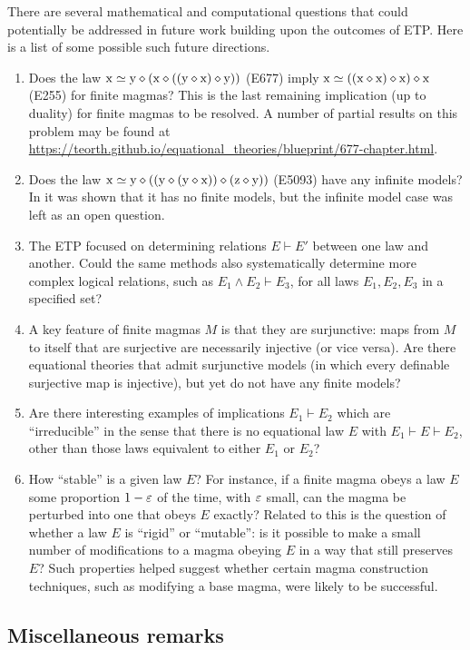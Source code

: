 There are several mathematical and computational questions that could potentially be addressed in future work building upon the outcomes of ETP.  Here is a list of some possible such future directions.
\begin{enumerate}
  \item Does the law $\mathrm{x} \simeq \mathrm{y} \diamond (\mathrm{x} \diamond ((\mathrm{y} \diamond \mathrm{x}) \diamond \mathrm{y}))$ (E677) imply $\mathrm{x} \simeq ((\mathrm{x} \diamond \mathrm{x}) \diamond \mathrm{x}) \diamond \mathrm{x}$ (E255) for finite magmas? This is the last remaining implication (up to duality) for finite magmas to be resolved.  A number of partial results on this problem may be found at \url{https://teorth.github.io/equational_theories/blueprint/677-chapter.html}.
  \item Does the law $\mathrm{x} \simeq \mathrm{y} \diamond ((\mathrm{y} \diamond (\mathrm{y} \diamond \mathrm{x})) \diamond (\mathrm{z} \diamond \mathrm{y}))$ (E5093) have any infinite models? In \cite{Kisielewicz2} it was shown that it has no finite models, but the infinite model case was left as an open question.
  \item The ETP focused on determining relations $E \vdash E'$ between one law and another.  Could the same methods also systematically determine more complex logical relations, such as $E_1 \wedge E_2 \vdash E_3$, for all laws $E_1,E_2,E_3$ in a specified set?
  \item A key feature of finite magmas $M$ is that they are surjunctive: maps from $M$ to itself that are surjective are necessarily injective (or vice versa).  Are there equational theories that admit surjunctive models (in which every definable surjective map is injective), but yet do not have any finite models?
  \item Are there interesting examples of implications $E_1 \vdash E_2$ which are ``irreducible'' in the sense that there is no equational law $E$ with $E_1 \vdash E \vdash E_2$, other than those laws equivalent to either $E_1$ or $E_2$?
  \item How ``stable'' is a given law $E$?  For instance, if a finite magma obeys a law $E$ some proportion $1-\varepsilon$ of the time, with $\varepsilon$ small, can the magma be perturbed into one that obeys $E$ exactly?  Related to this is the question of whether a law $E$ is ``rigid'' or ``mutable'': is it possible to make a small number of modifications to a magma obeying $E$ in a way that still preserves $E$?  Such properties helped suggest whether certain magma construction techniques, such as modifying a base magma, were likely to be successful.
\end{enumerate}

\subsection{Miscellaneous remarks}

